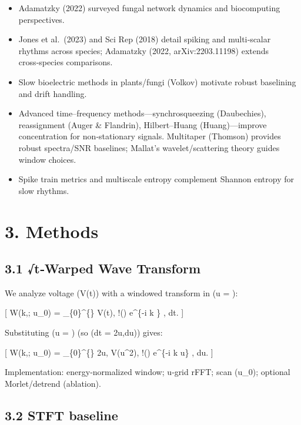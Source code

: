 \documentclass[
  11pt,
]{article}
\providecommand{\tightlist}{%
  \setlength{\itemsep}{0pt}\setlength{\parskip}{0pt}}
\begin{document}
\begin{itemize}
\tightlist
\item
  Adamatzky (2022) surveyed fungal network dynamics and biocomputing
  perspectives.
\item
  Jones et al.~(2023) and Sci Rep (2018) detail spiking and multi‑scalar
  rhythms across species; Adamatzky (2022, arXiv:2203.11198) extends
  cross‑species comparisons.
\item
  Slow bioelectric methods in plants/fungi (Volkov) motivate robust
  baselining and drift handling.
\item
  Advanced time--frequency methods---synchrosqueezing (Daubechies),
  reassignment (Auger \& Flandrin), Hilbert--Huang (Huang)---improve
  concentration for non‑stationary signals. Multitaper (Thomson)
  provides robust spectra/SNR baselines; Mallat's wavelet/scattering
  theory guides window choices.
\item
  Spike train metrics and multiscale entropy complement Shannon entropy
  for slow rhythms.
\end{itemize}

\hypertarget{methods}{%
\section{3. Methods}\label{methods}}

\hypertarget{twarped-wave-transform}{%
\subsection{3.1 √t‑Warped Wave Transform}\label{twarped-wave-transform}}

We analyze voltage (V(t)) with a windowed transform in (u = ):

{[} W(k,\tau; u\_0) = \int\_\{0\}\^{}\{\infty\} V(t),
\psi!\left(\right) e\^{}\{-i k \} ,
dt.  {]}

Substituting (u = ) (so (dt = 2u,du)) gives:

{[} W(k,\tau; u\_0) = \int\_\{0\}\^{}\{\infty\} 2u, V(u\^{}2),
\psi!\left(\right) e\^{}\{-i k u\} , du.  {]}

Implementation: energy‑normalized window; u‑grid rFFT; scan (u\_0);
optional Morlet/detrend (ablation).

\hypertarget{stft-baseline}{%
\subsection{3.2 STFT baseline}\label{stft-baseline}}
\end{document}
